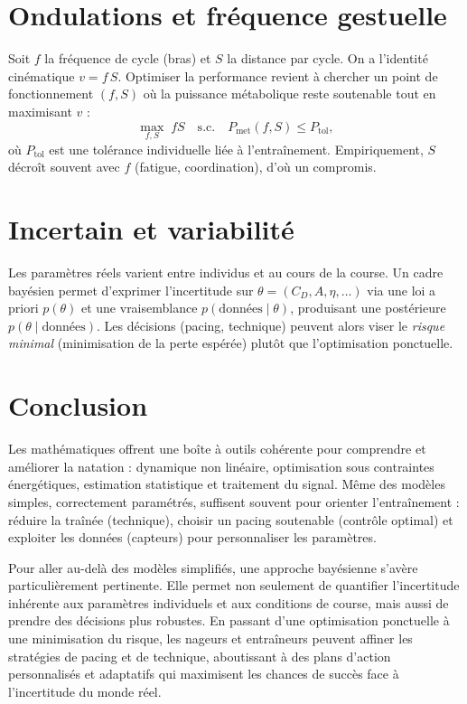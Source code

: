 \documentclass[12pt,a4paper]{article}
\begin{document}
\section{Ondulations et fréquence gestuelle}
Soit $f$ la fréquence de cycle (bras) et $S$ la distance par cycle. On a l'identité cinématique $v=f\,S$. Optimiser la performance revient à chercher un point de fonctionnement $(f,S)$ où la puissance métabolique reste soutenable tout en maximisant $v$ :
\begin{equation}
 \max_{f,S}\; fS \quad \text{s.c.}\quad P_{\mathrm{met}}(f,S)\le P_{\mathrm{tol}},
 \end{equation}
où $P_{\mathrm{tol}}$ est une tolérance individuelle liée à l'entraînement. Empiriquement, $S$ décroît souvent avec $f$ (fatigue, coordination), d'où un compromis.

\section{Incertain et variabilité}
Les paramètres réels varient entre individus et au cours de la course. Un cadre bayésien permet d'exprimer l'incertitude sur $\theta=(C_D,A,\eta,\ldots)$ via une loi a priori $p(\theta)$ et une vraisemblance $p(\text{données}\mid\theta)$, produisant une postérieure $p(\theta\mid\text{données})$. Les décisions (pacing, technique) peuvent alors viser le \emph{risque minimal} (minimisation de la perte espérée) plutôt que l'optimisation ponctuelle.

\section{Conclusion}
Les mathématiques offrent une boîte à outils cohérente pour comprendre et améliorer la natation : dynamique non linéaire, optimisation sous contraintes énergétiques, estimation statistique et traitement du signal. Même des modèles simples, correctement paramétrés, suffisent souvent pour orienter l'entraînement : réduire la traînée (technique), choisir un pacing soutenable (contrôle optimal) et exploiter les données (capteurs) pour personnaliser les paramètres.

Pour aller au-delà des modèles simplifiés, une approche bayésienne s'avère particulièrement pertinente. Elle permet non seulement de quantifier l'incertitude inhérente aux paramètres individuels et aux conditions de course, mais aussi de prendre des décisions plus robustes. En passant d'une optimisation ponctuelle à une minimisation du risque, les nageurs et entraîneurs peuvent affiner les stratégies de pacing et de technique, aboutissant à des plans d'action personnalisés et adaptatifs qui maximisent les chances de succès face à l'incertitude du monde réel.
\end{document}
